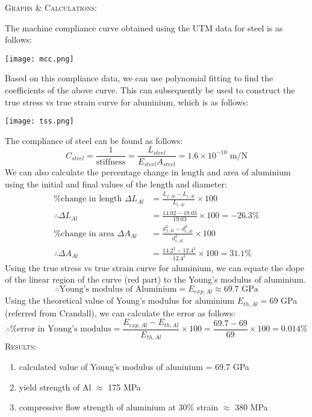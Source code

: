 \documentclass[a4paper, 11pt]{article}
\begin{document}
\textsc{Graphs \& Calculations:}
\vspace{2.5mm}

The machine compliance curve obtained using the UTM data for steel is as follows:

\begin{center}
\texttt{[image: mcc.png]}
\end{center}

Based on this compliance data, we can use polynomial fitting to find the coefficients of the above curve. This can subsequently be used to construct the true stress vs true strain curve for aluminium, which is as follows:

\begin{center}
\texttt{[image: tss.png]}
\end{center}

The compliance of steel can be found as follows:
$$C_{steel}=\frac{1}{\text{stiffness}}=\frac{L_{steel}}{E_{steel}A_{steel}}=1.6\times 10^{-10}\text{ m/N}$$
We can also calculate the percentage change in length and area of aluminium using the initial and final values of the length and diameter:
\begin{align*}
	\text{\% change in length } \Delta L_{Al}&=\frac{L_{f,Al}-L_{i,Al}}{L_{i,Al}}\times 100\\
	\therefore\Delta L_{Al}&=\frac{14.02-19.03}{19.03}\times 100 = -26.3\%\\
	\text{\% change in area } \Delta A_{Al}&=\frac{d_{f,Al}^2-d_{i,Al}^2}{d_{i,Al}^2}\times 100\\
	\therefore\Delta A_{Al}&=\frac{14.2^2-12.4^2}{12.4^2}\times 100 = 31.1\%
\end{align*}
Using the true stress vs true strain curve for aluminium, we can equate the slope of the linear region of the curve (red part) to the Young's modulus of aluminium.
$$\therefore\text{Young's modulus of Aluminium}=E_{exp,Al}\approx 69.7\text{ GPa}$$
Using the theoretical value of Young's modulus for aluminium $E_{th,Al}=69$ GPa (referred from Crandall), we can calculate the error as follows:
$$\therefore \text{\% error in Young's modulus}=\frac{E_{exp,Al}-E_{th,Al}}{E_{th,Al}}\times 100=\frac{69.7-69}{69}\times 100 = 0.014\%$$
\textsc{Results:}
\begin{enumerate}[label=\roman*)]
		\itemsep0em
		\item calculated value of Young's modulus of aluninium = 69.7 GPa
		\item yield strength of Al $\approx$ 175 MPa
		\item compressive flow strength of aluminium at 30\% strain $\approx$ 380 MPa
\end{enumerate}
\end{document}
